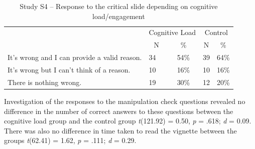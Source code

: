 \documentclass[
  american,
  man,floatsintext]{apa7}
\begin{document}
\begin{table}[tbp]

\begin{center}
\begin{threeparttable}

\caption{\label{tab:tabS4tab1dumb1all}Study S4 – Response to the critical slide depending on cognitive load/engagement}

\begin{tabular}{llccc}
\toprule
 & \multicolumn{2}{c}{Cognitive Load} & \multicolumn{2}{c}{Control} \\
\cmidrule(r){2-3} \cmidrule(r){4-5}
 & \multicolumn{1}{c}{N} & \multicolumn{1}{c}{\%} & \multicolumn{1}{c}{N} & \multicolumn{1}{c}{\%}\\
\midrule
It's wrong and I can provide a valid reason. & 34 & 54\% & 39 & 64\%\\
It's wrong but I can't think of a reason. & 10 & 16\% & 10 & 16\%\\
There is nothing wrong. & 19 & 30\% & 12 & 20\%\\
\bottomrule
\end{tabular}

\end{threeparttable}
\end{center}

\end{table}

Investigation of the responses to the manipulation check questions revealed no difference in the number of correct answers to these questions between the cognitive load group and the control group \emph{t}(121.92) = 0.50, \emph{p} = .618; \emph{d} = 0.09. There was also no difference in time taken to read the vignette between the groups \emph{t}(62.41) = 1.62, \emph{p} = .111; \emph{d} = 0.29.
\end{document}
